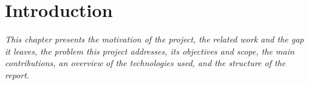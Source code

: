 \chapter{Introduction}
\label{chap:introduction}
\textit{This chapter presents the motivation of the project, the related work and the gap it leaves, the problem this project addresses, its objectives and scope, the main contributions, an overview of the technologies used, and the structure of the report.}










